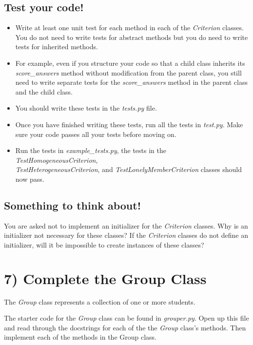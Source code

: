 \documentclass[12pt]{article}
\begin{document}
\subsection*{Test your code!}
\begin{itemize}
    \item Write at least one unit test for each method in each of the \textit{Criterion}
    classes. You do not need to write tests for abstract methods but you do need to
    write tests for inherited methods.

    \item For example, even if you structure your code so that a child class
    inherits its \textit{score\_answers} method without modification from the parent class,
    you still need to write separate tests for the \textit{score\_answers} method in
    the parent class and the child class.

    \item You should write these tests in the \textit{tests.py} file.
    \item Once you have finished writing these tests, run all the tests in \textit{test.py}.
    Make sure your code passes all your tests before moving on.
    \item Run the tests in \textit{example\_tests.py}, the tests in the
    \textit{TestHomogeneousCriterion},\\ \textit{TestHeterogeneousCriterion}, and
    \textit{TestLonelyMemberCriterion} classes should now pass.
\end{itemize}

\subsection*{Something to think about!}
You are asked not to implement an initializer for the \textit{Criterion} classes.
Why is an initializer not necessary for these classes? If the \textit{Criterion}
classes do not define an initializer, will it be impossible to create instances
of these classes?

\section*{7) Complete the Group Class}
The \textit{Group} class represents a collection of one or more students.

\bigskip

\noindent The starter code for the \textit{Group} class can be found in \textit{grouper.py}.
Open up this file and read through the docstrings for each of the the \textit{Group}
class’s methods. Then implement each of the methods in the Group class.
\end{document}
